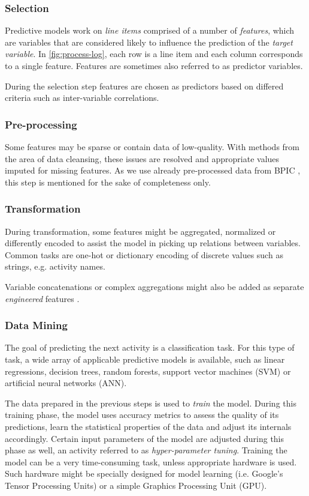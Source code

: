 \subsubsection*{Selection}
Predictive models work on \textit{line items} comprised of a number of \textit{features}, which are variables that are considered likely to influence the prediction of the \textit{target variable}. In \autoref{fig:process-log}, each row is a line item and each column corresponds to a single feature. Features are sometimes also referred to as predictor variables.

During the selection step features are chosen as predictors based on differed criteria such as inter-variable correlations.

\subsubsection*{Pre-processing}
Some features may be sparse or contain data of low-quality. With methods from the area of data cleansing, these issues are resolved and appropriate values imputed for missing features. As we use already pre-processed data from BPIC \cite{BPIC2011, BPIC2012, BPIC2017}, this step is mentioned for the sake of completeness only.

\subsubsection*{Transformation}
\label{sec:predictive-model-development:transformation}
During transformation, some features might be aggregated, normalized or differently encoded to assist the model in picking up relations between variables. Common tasks are one-hot or dictionary encoding of discrete values such as strings, e.g. activity names.

Variable concatenations or complex aggregations might also be added as separate \textit{engineered} features \cite{schoenig2018}.

\subsubsection*{Data Mining}
The goal of predicting the next activity is a classification task. For this type of task, a wide array of applicable predictive models is available, such as linear regressions, decision trees, random forests, support vector machines (SVM) or artificial neural networks (ANN).

The data prepared in the previous steps is used to \textit{train} the model. During this training phase, the model uses accuracy metrics to assess the quality of its predictions, learn the statistical properties of the data and adjust its internals accordingly. Certain input parameters of the model are adjusted during this phase as well, an activity referred to as \textit{hyper-parameter tuning}. Training the model can be a very time-consuming task, unless appropriate hardware is used. Such hardware might be specially designed for model learning (i.e. Google's Tensor Processing Units) or a simple Graphics Processing Unit (GPU).

